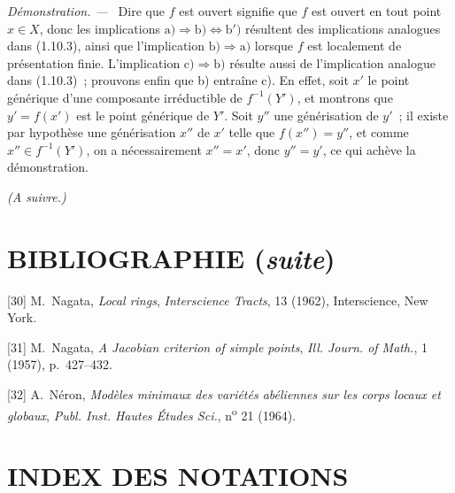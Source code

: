 \documentclass[10pt,oneside]{book}
\newcommand{\oldpage}[2][]{%
  \setcounter{footnote}{0}%
  \marginpar{\scriptsize\textbf{#1}~|~#2}\ignorespaces}
\newenvironment{proof}{%
  \par\medskip\noindent\textit{Démonstration. ---\ }}{\par}
\begin{document}
\begin{proof}
Dire que $f$ est ouvert signifie que $f$ est ouvert en tout point $x\in X$,
donc les implications
$\mathrm{a)}\Rightarrow\mathrm{b)}\Leftrightarrow\mathrm{b')}$ résultent des
implications analogues dans (1.10.3), ainsi que l'implication
$\mathrm{b)}\Rightarrow\mathrm{a)}$ lorsque $f$ est localement de présentation
finie. L'implication $\mathrm{c)}\Rightarrow\mathrm{b)}$ résulte aussi de
l'implication analogue dans (1.10.3)~; prouvons enfin que b) entraîne c). En
effet, soit $x'$ le point générique d'une composante
irréductible de $f^{-1}(Y')$, et montrons que $y'=f(x')$ est le point générique
de $Y'$. Soit $y''$ une générisation de $y'$~; il existe par hypothèse une
générisation $x''$ de $x'$ telle que $f(x'')=y''$, et comme
$x''\in f^{-1}(Y')$, on a nécessairement $x''=x'$, donc $y''=y'$, ce qui
achève la démonstration.
\end{proof}

\begin{center}
\emph{(A suivre.)}
\end{center}

\clearpage
\oldpage[IV-1]{251}
{}
\section*{BIBLIOGRAPHIE (\emph{suite})}

\begingroup
\small
\setlength{\parindent}{0pt}
\setlength{\parskip}{3pt}
[30] M.~Nagata, \emph{Local rings}, \emph{Interscience Tracts}, 13 (1962),
Interscience, New York.

[31] M.~Nagata, \emph{A Jacobian criterion of simple points},
\emph{Ill. Journ. of Math.}, 1 (1957), p.~427--432.

[32] A.~Néron, \emph{Modèles minimaux des variétés abéliennes sur les corps
locaux et globaux}, \emph{Publ. Inst. Hautes Études Sci.}, n\textsuperscript{o}
21 (1964).

\clearpage
\oldpage[IV-1]{252}
{}
\section*{INDEX DES NOTATIONS}
\end{document}
